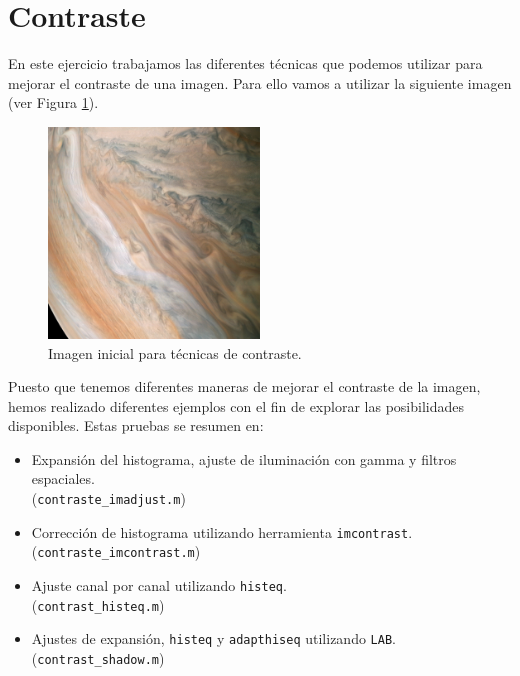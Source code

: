 \documentclass[12pt]{article}
\begin{document}
	\pagebreak
	
	\section{Contraste}
	\noindent En este ejercicio trabajamos las diferentes técnicas que podemos utilizar para mejorar el contraste de una imagen. Para ello vamos a utilizar la siguiente imagen (ver Figura \ref{img: contraste src}).
	
	\begin{figure}[h]
		\begin{center}
			\includegraphics[width=0.5\textwidth]{img/contraste.jpg}
			\caption{Imagen inicial para técnicas de contraste.}
			\label{img: contraste src}
		\end{center}
	\end{figure}

	\noindent Puesto que tenemos diferentes maneras de mejorar el contraste de la imagen, hemos realizado diferentes ejemplos con el fin de explorar las posibilidades disponibles. Estas pruebas se resumen en:
	\begin{itemize}
		\item Expansión del histograma, ajuste de iluminación con gamma y filtros espaciales.\\ (\texttt{contraste\_imadjust.m})
		\item Corrección de histograma utilizando herramienta \texttt{imcontrast}.\\
		(\texttt{contraste\_imcontrast.m})
		\item Ajuste canal por canal utilizando \texttt{histeq}.\\
		(\texttt{contrast\_histeq.m})
		\item Ajustes de expansión, \texttt{histeq} y \texttt{adapthiseq} utilizando \texttt{LAB}.\\
		(\texttt{contrast\_shadow.m})
	\end{itemize}
\end{document}
